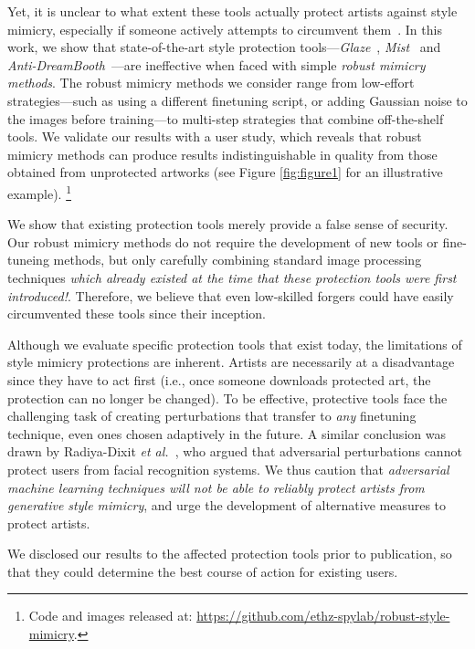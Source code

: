 \documentclass{article}
\newcommand\blfootnote[1]{
    \begingroup
    \renewcommand\thefootnote{}\footnote{#1}
    \addtocounter{footnote}{-1}
    \endgroup
}
\newcommand{\repo}{\url{https://github.com/ethz-spylab/robust-style-mimicry}}
\begin{document}
Yet, it is unclear to what extent these tools actually protect artists against style mimicry, especially if someone actively attempts to circumvent them~\citep{radiya2021data}.
In this work, we show that state-of-the-art style protection tools---\emph{Glaze}~\citep{glaze}, \emph{Mist}~\citep{mist} and \emph{Anti-DreamBooth}~\citep{antidreambooth}---are ineffective when faced with simple \emph{robust mimicry methods}. The robust mimicry methods we consider range from low-effort strategies---such as using a different finetuning script, or adding Gaussian noise to the images before training---to multi-step strategies that combine off-the-shelf tools.
We validate our results with a user study, which reveals
that robust mimicry methods can produce results indistinguishable in quality from those obtained from unprotected artworks (see Figure \ref{fig:figure1} for an illustrative example).\blfootnote{Code and images released at: \repo.}

We show that existing protection tools merely provide a false sense of security. 
Our robust mimicry methods do not require the development of new tools or fine-tuneing methods, but only carefully combining standard image processing techniques
\emph{which already existed at the time that these protection tools were first introduced!}. Therefore, we believe that even low-skilled forgers could have easily circumvented these tools since their inception.

Although we evaluate specific protection tools that exist today, the limitations of style mimicry protections are inherent. Artists are necessarily at a disadvantage since they have to act first (i.e., once someone downloads protected art, the protection can no longer be changed). 
To be effective, protective tools face the challenging task of creating perturbations that transfer to \emph{any} finetuning technique, even ones chosen adaptively in the future. A similar conclusion was drawn by Radiya-Dixit \emph{et al.}~\citep{radiya2021data}, who argued that adversarial perturbations cannot protect users from facial recognition systems.
We thus caution that \emph{adversarial machine learning techniques will not be able to reliably protect artists from generative style mimicry}, and urge the development of alternative measures to protect artists.

We disclosed our results to the affected protection tools prior to publication, so that they could determine the best course of action for existing users.
\end{document}
